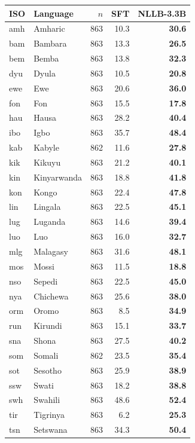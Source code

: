 \begin{table}[t]
\centering\footnotesize
\setlength{\tabcolsep}{3pt}
\begin{tabular}{@{}llrrr@{}}
\toprule
ISO & Language & $n$ & SFT & NLLB-3.3B \\
\midrule
amh & Amharic & 863 & 10.3 & \textbf{30.6} \\
bam & Bambara & 863 & 13.3 & \textbf{26.5} \\
bem & Bemba & 863 & 13.8 & \textbf{32.3} \\
dyu & Dyula & 863 & 10.5 & \textbf{20.8} \\
ewe & Ewe & 863 & 20.6 & \textbf{36.0} \\
fon & Fon & 863 & 15.5 & \textbf{17.8} \\
hau & Hausa & 863 & 28.2 & \textbf{40.4} \\
ibo & Igbo & 863 & 35.7 & \textbf{48.4} \\
kab & Kabyle & 862 & 11.6 & \textbf{27.8} \\
kik & Kikuyu & 863 & 21.2 & \textbf{40.1} \\
kin & Kinyarwanda & 863 & 18.8 & \textbf{41.8} \\
kon & Kongo & 863 & 22.4 & \textbf{47.8} \\
lin & Lingala & 863 & 22.5 & \textbf{45.1} \\
lug & Luganda & 863 & 14.6 & \textbf{39.4} \\
luo & Luo & 863 & 16.0 & \textbf{32.7} \\
mlg & Malagasy & 863 & 31.6 & \textbf{48.1} \\
mos & Mossi & 863 & 11.5 & \textbf{18.8} \\
nso & Sepedi & 863 & 22.5 & \textbf{45.0} \\
nya & Chichewa & 863 & 25.6 & \textbf{38.0} \\
orm & Oromo & 863 & 8.5 & \textbf{34.9} \\
run & Kirundi & 863 & 15.1 & \textbf{33.7} \\
sna & Shona & 863 & 27.5 & \textbf{40.2} \\
som & Somali & 862 & 23.5 & \textbf{35.4} \\
sot & Sesotho & 863 & 25.9 & \textbf{38.9} \\
ssw & Swati & 863 & 18.2 & \textbf{38.8} \\
swh & Swahili & 863 & 48.6 & \textbf{52.4} \\
tir & Tigrinya & 863 & 6.2 & \textbf{25.3} \\
tsn & Setswana & 863 & 34.3 & \textbf{50.4} \\

\end{tabular}
\end{table}
